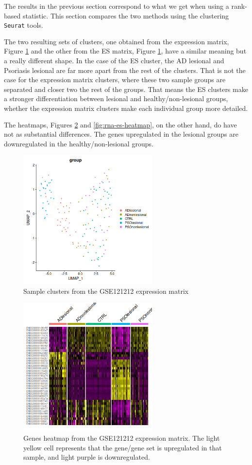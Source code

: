 \documentclass[aps,prb,twocolumn,superscriptaddress,floatfix,longbibliography]{revtex4-2}
\newcounter{para}
\begin{document}
The results in the previous section correspond to what we get when using a rank-based statistic. This section compares the two methods using the clustering \texttt{Seurat} tools.

The two resulting sets of clusters, one obtained from the expression matrix, Figure \ref{fig:rna-expr-clusters} and the other from the ES matrix, Figure \ref{fig:rna-expr-clusters}, have a similar meaning but a really different shape. In the case of the ES cluster, the AD lesional and Psoriasis lesional are far more apart from the rest of the clusters. That is not the case for the expression matrix clusters, where these two sample groups are separated and closer two the rest of the groups. That means the ES clusters make a stronger differentiation between lesional and healthy/non-lesional groups, whether the expression matrix clusters make each individual group more detailed.

The heatmaps, Figures \ref{fig:rna-expr-heatmap} and \ref{fig:rna-es-heatmap}, on the other hand, do have not as substantial differences. The genes upregulated in the lesional groups are downregulated in the healthy/non-lesional groups.

\begin{figure}[h]
\centering
\includegraphics[clip=true,width=7cm]{img/GSE121212-expr-clusters.png}
\caption{Sample clusters from the GSE121212 expression matrix}
\label{fig:rna-expr-clusters}
\end{figure}

\begin{figure}[h]
\centering
\includegraphics[clip=true,width=7cm]{img/GSE121212-expr-heatmap.png}
\caption{Genes heatmap from the GSE121212 expression matrix. The light yellow cell represents that the gene/gene set is upregulated in that sample, and light purple is downregulated.}
\label{fig:rna-expr-heatmap}
\end{figure}
\end{document}
